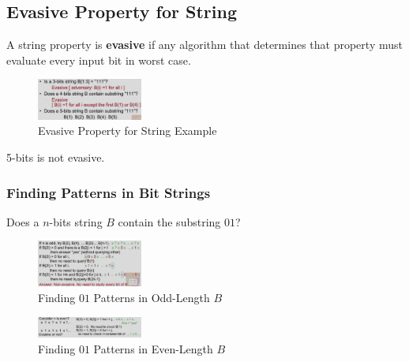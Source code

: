 \subsection{Evasive Property for String}
\begin{definition}
    A string property is \textbf{evasive} if any algorithm that determines that property must evaluate every input bit in worst case.
\end{definition}

\begin{figure}[H]
    \centering
    \includegraphics[width=0.309\textwidth]{pic/DAA5/Evasive Property for String exp}
    \caption{Evasive Property for String Example}
\end{figure}
5-bits is not evasive.

\subsubsection{Finding Patterns in Bit Strings}
Does a $n$-bits string $B$ contain the substring $01$?

\begin{figure}[H]
    \centering
    \includegraphics[width=0.309\textwidth]{pic/DAA5/Finding Patterns in Bit Strings}
    \caption{Finding $01$ Patterns in Odd-Length $B$}
\end{figure}


\begin{figure}[!htb]
    \centering
    \includegraphics[width=0.309\textwidth]{pic/DAA5/Finding Patterns in Bit Strings2}
    \caption{Finding $01$ Patterns in Even-Length $B$}
\end{figure}


